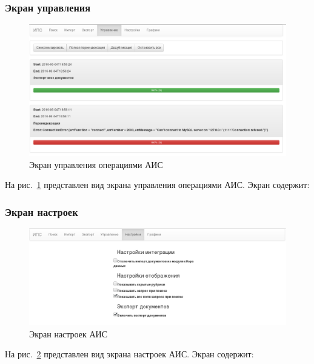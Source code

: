 \clearpage
\subsubsection{Экран управления}

\begin{figure}[h!]
\centering
\includegraphics[width=0.9\linewidth]{technology/gui_resync}
\caption{Экран управления операциями АИС}
\label{figure:guiResync}
\end{figure}

На рис.~\ref{figure:guiResync} представлен вид экрана управления операциями АИС. Экран содержит:
\begin{itemize}

\end{itemize}

\clearpage
\subsubsection{Экран настроек}

\begin{figure}[h!]
\centering
\includegraphics[width=0.9\linewidth]{technology/gui_options}
\caption{Экран настроек АИС}
\label{figure:guiOptions}
\end{figure}

На рис.~\ref{figure:guiOptions} представлен вид экрана настроек АИС. Экран содержит:
\begin{itemize}

\end{itemize}

